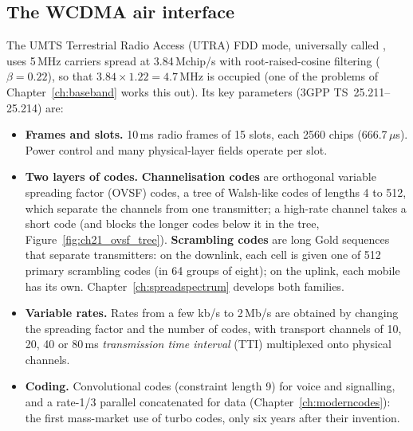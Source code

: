 \subsection{The WCDMA air interface}

The UMTS Terrestrial Radio Access (UTRA) FDD mode, universally called , uses 5\,MHz
carriers spread at 3.84\,Mchip/s with root-raised-cosine filtering ($\beta=0.22$), so that
$3.84\times1.22=4.7$\,MHz is occupied (one of the problems of Chapter~\ref{ch:baseband} works this
out). Its key parameters (3GPP TS~25.211--25.214) are:
\begin{itemize}


\item \textbf{Frames and slots.} 10\,ms radio frames of 15 slots, each 2560 chips (666.7\,$\mu$s).
Power control and many physical-layer fields operate per slot.

\item \textbf{Two layers of codes.} \textbf{Channelisation codes} are
orthogonal variable spreading factor (OVSF) codes, a tree of Walsh-like codes of lengths 4 to 512,
which separate the channels from one transmitter; a high-rate channel takes a short code (and blocks
the longer codes below it in the tree, Figure~\ref{fig:ch21_ovsf_tree}).
\textbf{Scrambling codes} are long Gold sequences that separate transmitters:
on the downlink, each cell is given one of 512 primary scrambling codes (in 64 groups of eight); on
the uplink, each mobile has its own. Chapter~\ref{ch:spreadspectrum} develops both families.

\item \textbf{Variable rates.} Rates from a few kb/s to 2\,Mb/s are obtained by changing the
spreading factor and the number of codes, with transport channels of 10, 20, 40 or 80\,ms
\emph{transmission time interval} (TTI) multiplexed onto physical channels.
\item \textbf{Coding.} Convolutional codes (constraint length 9) for voice and signalling, and a
rate-1/3 parallel concatenated  for data (Chapter~\ref{ch:moderncodes}): the first
mass-market use of turbo codes, only six years after their invention.


\end{itemize}
